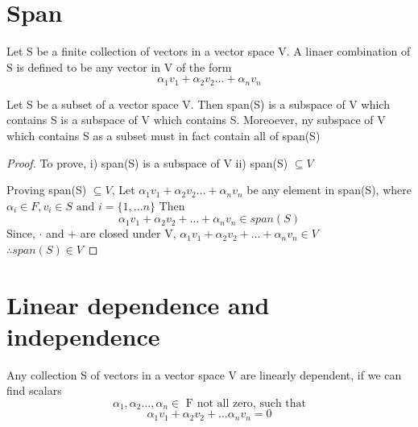 \documentclass{report}
\begin{document}
\section{Span}
\begin{definition}[Spans]
    Let S be a finite collection of vectors in a vector space V. 
    A linaer combination of S is defined to be any vector in V of the form 
    \[
        \alpha_1 v_1 + \alpha_2 v_2 \dots + \alpha_n v_n
    \]
\end{definition}
\begin{theorem}
    Let S be a subset of a vector space V. Then span(S) is a subspace of V which contains S is a subspace of V which contains S. Moreoever, ny subspace of V which contains S as a subset must in fact contain all of span(S)
\end{theorem}
\begin{proof}
    To prove, 
    i) span(S) is a subspace of V 
    ii) span(S) $\subseteq V$ 

  Proving  span(S) $\subseteq V$,
    Let $\alpha_1v_1 + \alpha_2 v_2 \dots + \alpha_nv_n$ be any element in span(S), where $\alpha_i \in F, v_i \in S \text{ and } i = \{1,\dots n\}$ 
    Then
    \[
        \alpha_1v_1 + \alpha_2 v_2 + \dots + \alpha_nv_n \in span(S)
    \]
    Since, $\cdot$ and + are closed under V, $\alpha_1v_1 + \alpha_2 v_2 + \dots + \alpha_nv_n \in V$ \\
    $\therefore span(S) \in V$
\end{proof}

\section{Linear dependence and independence}
\begin{definition}
    Any collection S of vectors in a vector space V are linearly dependent, if we can find scalars \[
        \alpha_1, \alpha_2 \dots, \alpha_n \in \text{ F not all zero, such that}
    \]
    \begin{displaymath}
      \alpha_1 v_1 + \alpha_2v_2 + \dots \alpha_n v_n = 0  
    \end{displaymath}
\end{definition}
\end{document}
